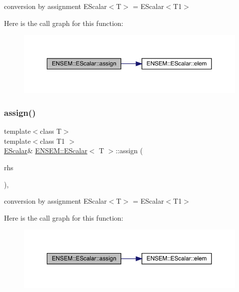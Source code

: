 conversion by assignment E\+Scalar$<$\+T$>$ = E\+Scalar$<$\+T1$>$ 

Here is the call graph for this function\+:
\nopagebreak
\begin{figure}[H]
\begin{center}
\leavevmode
\includegraphics[width=350pt]{d0/d82/classENSEM_1_1EScalar_aa9a54e03830d13eb6a124c64c6a46dd1_cgraph}
\end{center}
\end{figure}
\mbox{\label{classENSEM_1_1EScalar_aa9a54e03830d13eb6a124c64c6a46dd1}} 
\subsubsection{\texorpdfstring{assign()}{assign()}\hspace{0.1cm}{\footnotesize\ttfamily [9/9]}}
{\footnotesize\ttfamily template$<$class T$>$ \\
template$<$class T1 $>$ \\
\mbox{\hyperlink{classENSEM_1_1EScalar}{E\+Scalar}}\& \mbox{\hyperlink{classENSEM_1_1EScalar}{E\+N\+S\+E\+M\+::\+E\+Scalar}}$<$ T $>$\+::assign (\begin{DoxyParamCaption}\item[{const \mbox{\hyperlink{classENSEM_1_1EScalar}{E\+Scalar}}$<$ T1 $>$ \&}]{rhs }\end{DoxyParamCaption})\hspace{0.3cm}{\ttfamily [inline]}, {\ttfamily [protected]}}



conversion by assignment E\+Scalar$<$\+T$>$ = E\+Scalar$<$\+T1$>$ 

Here is the call graph for this function\+:
\nopagebreak
\begin{figure}[H]
\begin{center}
\leavevmode
\includegraphics[width=350pt]{d0/d82/classENSEM_1_1EScalar_aa9a54e03830d13eb6a124c64c6a46dd1_cgraph}
\end{center}
\end{figure}
\mbox{\label{classENSEM_1_1EScalar_a8de3b840367731efc862fc6943119152}} 
